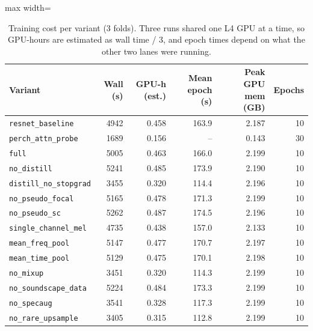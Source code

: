 \begin{table}[H]\centering\small
\caption{Training cost per variant (3 folds). Three runs shared one L4 GPU at a time, so GPU-hours are estimated as wall time / 3, and epoch times depend on what the other two lanes were running.}
\label{tab:traincost}
\begin{adjustbox}{max width=\linewidth}
\begin{tabular}{lrrrrr}
\toprule
Variant & Wall (s) & GPU-h (est.) & Mean epoch (s) & Peak GPU mem (GB) & Epochs \\
\midrule
\texttt{resnet\_baseline} & 4942 & 0.458 & 163.9 & 2.187 & 10 \\
\texttt{perch\_attn\_probe} & 1689 & 0.156 & -- & 0.143 & 30 \\
\texttt{full} & 5005 & 0.463 & 166.0 & 2.199 & 10 \\
\texttt{no\_distill} & 5241 & 0.485 & 173.9 & 2.190 & 10 \\
\texttt{distill\_no\_stopgrad} & 3455 & 0.320 & 114.4 & 2.196 & 10 \\
\texttt{no\_pseudo\_focal} & 5165 & 0.478 & 171.3 & 2.199 & 10 \\
\texttt{no\_pseudo\_sc} & 5262 & 0.487 & 174.5 & 2.196 & 10 \\
\texttt{single\_channel\_mel} & 4735 & 0.438 & 157.0 & 2.133 & 10 \\
\texttt{mean\_freq\_pool} & 5147 & 0.477 & 170.7 & 2.197 & 10 \\
\texttt{mean\_time\_pool} & 5129 & 0.475 & 170.1 & 2.198 & 10 \\
\texttt{no\_mixup} & 3451 & 0.320 & 114.3 & 2.199 & 10 \\
\texttt{no\_soundscape\_data} & 5224 & 0.484 & 173.3 & 2.199 & 10 \\
\texttt{no\_specaug} & 3541 & 0.328 & 117.3 & 2.199 & 10 \\
\texttt{no\_rare\_upsample} & 3405 & 0.315 & 112.8 & 2.199 & 10 \\
\bottomrule
\end{tabular}
\end{adjustbox}
\end{table}
